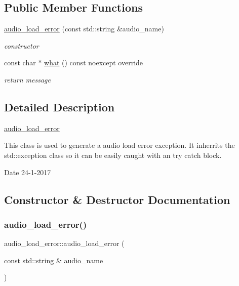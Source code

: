\subsection*{Public Member Functions}
\begin{DoxyCompactItemize}
\item 
\hyperlink{classaudio__load__error_a6eea512cfea7b3d438afc5c1af8c63aa}{audio\+\_\+load\+\_\+error} (const std\+::string \&audio\+\_\+name)
\begin{DoxyCompactList}\small\item\em constructor \end{DoxyCompactList}\item 
const char $\ast$ \hyperlink{classaudio__load__error_a364ad9c1cb7de37f0cb3e33dbebbaa47}{what} () const noexcept override
\begin{DoxyCompactList}\small\item\em return message \end{DoxyCompactList}\end{DoxyCompactItemize}


\subsection{Detailed Description}
\hyperlink{classaudio__load__error}{audio\+\_\+load\+\_\+error} 

This class is used to generate a audio load error exception. It inherrits the std\+::exception class so it can be easily caught with an try catch block.

\begin{DoxyDate}{Date}
24-\/1-\/2017 
\end{DoxyDate}


\subsection{Constructor \& Destructor Documentation}
\mbox{\label{classaudio__load__error_a6eea512cfea7b3d438afc5c1af8c63aa}} 
\subsubsection{\texorpdfstring{audio\+\_\+load\+\_\+error()}{audio\_load\_error()}}
{\footnotesize\ttfamily audio\+\_\+load\+\_\+error\+::audio\+\_\+load\+\_\+error (\begin{DoxyParamCaption}\item[{const std\+::string \&}]{audio\+\_\+name }\end{DoxyParamCaption})\hspace{0.3cm}{\ttfamily [inline]}}



